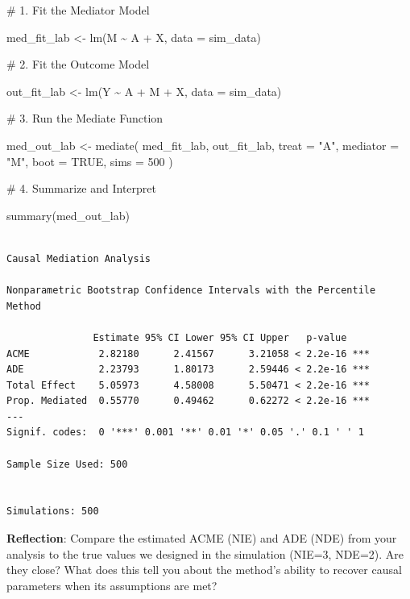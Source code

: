 \documentclass[
  10pt,
  letterpaper,
  DIV=11,
  numbers=noendperiod,
  oneside]{scrartcl}
\newenvironment{Shaded}{\begin{snugshade}}{\end{snugshade}}
\newcommand{\AttributeTok}[1]{\textcolor[rgb]{0.40,0.45,0.13}{#1}}
\newcommand{\CommentTok}[1]{\textcolor[rgb]{0.37,0.37,0.37}{#1}}
\newcommand{\ConstantTok}[1]{\textcolor[rgb]{0.56,0.35,0.01}{#1}}
\newcommand{\DecValTok}[1]{\textcolor[rgb]{0.68,0.00,0.00}{#1}}
\newcommand{\FunctionTok}[1]{\textcolor[rgb]{0.28,0.35,0.67}{#1}}
\newcommand{\NormalTok}[1]{\textcolor[rgb]{0.00,0.23,0.31}{#1}}
\newcommand{\OtherTok}[1]{\textcolor[rgb]{0.00,0.23,0.31}{#1}}
\newcommand{\SpecialCharTok}[1]{\textcolor[rgb]{0.37,0.37,0.37}{#1}}
\newcommand{\StringTok}[1]{\textcolor[rgb]{0.13,0.47,0.30}{#1}}
\begin{document}
\begin{Shaded}
\begin{Highlighting}[]
\CommentTok{\# 1. Fit the Mediator Model}

\NormalTok{med\_fit\_lab }\OtherTok{\textless{}{-}} \FunctionTok{lm}\NormalTok{(M }\SpecialCharTok{\textasciitilde{}}\NormalTok{ A }\SpecialCharTok{+}\NormalTok{ X, }\AttributeTok{data =}\NormalTok{ sim\_data)}

\CommentTok{\# 2. Fit the Outcome Model}

\NormalTok{out\_fit\_lab }\OtherTok{\textless{}{-}} \FunctionTok{lm}\NormalTok{(Y }\SpecialCharTok{\textasciitilde{}}\NormalTok{ A }\SpecialCharTok{+}\NormalTok{ M }\SpecialCharTok{+}\NormalTok{ X, }\AttributeTok{data =}\NormalTok{ sim\_data)}

\CommentTok{\# 3. Run the Mediate Function}

\NormalTok{med\_out\_lab }\OtherTok{\textless{}{-}} \FunctionTok{mediate}\NormalTok{(}
\NormalTok{  med\_fit\_lab,}
\NormalTok{  out\_fit\_lab,}
  \AttributeTok{treat =} \StringTok{"A"}\NormalTok{,}
  \AttributeTok{mediator =} \StringTok{"M"}\NormalTok{,}
  \AttributeTok{boot =} \ConstantTok{TRUE}\NormalTok{,}
  \AttributeTok{sims =} \DecValTok{500}
\NormalTok{)}

\CommentTok{\# 4. Summarize and Interpret}

\FunctionTok{summary}\NormalTok{(med\_out\_lab)}
\end{Highlighting}
\end{Shaded}

\begin{verbatim}

Causal Mediation Analysis 

Nonparametric Bootstrap Confidence Intervals with the Percentile Method

               Estimate 95% CI Lower 95% CI Upper   p-value    
ACME            2.82180      2.41567      3.21058 < 2.2e-16 ***
ADE             2.23793      1.80173      2.59446 < 2.2e-16 ***
Total Effect    5.05973      4.58008      5.50471 < 2.2e-16 ***
Prop. Mediated  0.55770      0.49462      0.62272 < 2.2e-16 ***
---
Signif. codes:  0 '***' 0.001 '**' 0.01 '*' 0.05 '.' 0.1 ' ' 1

Sample Size Used: 500 


Simulations: 500 
\end{verbatim}

\textbf{Reflection}: Compare the estimated ACME (NIE) and ADE (NDE) from
your analysis to the true values we designed in the simulation (NIE=3,
NDE=2). Are they close? What does this tell you about the method's
ability to recover causal parameters when its assumptions are met?
\end{document}
